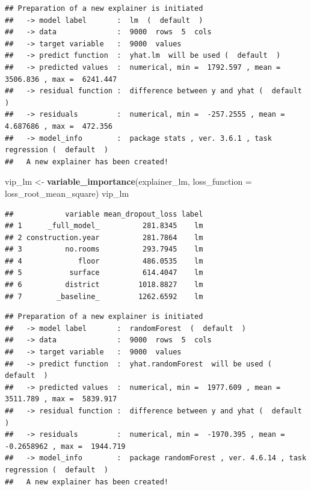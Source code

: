\documentclass[12pt,]{krantz}
\newenvironment{Shaded}{\begin{snugshade}}{\end{snugshade}}
\newcommand{\DataTypeTok}[1]{\textcolor[rgb]{0.13,0.29,0.53}{#1}}
\newcommand{\DecValTok}[1]{\textcolor[rgb]{0.00,0.00,0.81}{#1}}
\newcommand{\KeywordTok}[1]{\textcolor[rgb]{0.13,0.29,0.53}{\textbf{#1}}}
\newcommand{\NormalTok}[1]{#1}
\newcommand{\OperatorTok}[1]{\textcolor[rgb]{0.81,0.36,0.00}{\textbf{#1}}}
\newcommand{\OtherTok}[1]{\textcolor[rgb]{0.56,0.35,0.01}{#1}}
\newcommand{\StringTok}[1]{\textcolor[rgb]{0.31,0.60,0.02}{#1}}
\begin{document}
\begin{verbatim}
## Preparation of a new explainer is initiated
##   -> model label       :  lm  (  default  )
##   -> data              :  9000  rows  5  cols 
##   -> target variable   :  9000  values 
##   -> predict function  :  yhat.lm  will be used (  default  )
##   -> predicted values  :  numerical, min =  1792.597 , mean =  3506.836 , max =  6241.447  
##   -> residual function :  difference between y and yhat (  default  )
##   -> residuals         :  numerical, min =  -257.2555 , mean =  4.687686 , max =  472.356  
##   -> model_info        :  package stats , ver. 3.6.1 , task regression (  default  ) 
##   A new explainer has been created!
\end{verbatim}

\begin{Shaded}
\begin{Highlighting}[]
\NormalTok{vip_lm <-}\StringTok{ }\KeywordTok{variable_importance}\NormalTok{(explainer_lm, }
            \DataTypeTok{loss_function =}\NormalTok{ loss_root_mean_square)}
\NormalTok{vip_lm}
\end{Highlighting}
\end{Shaded}

\begin{verbatim}
##            variable mean_dropout_loss label
## 1      _full_model_          281.8345    lm
## 2 construction.year          281.7864    lm
## 3          no.rooms          293.7945    lm
## 4             floor          486.0535    lm
## 5           surface          614.4047    lm
## 6          district         1018.8827    lm
## 7        _baseline_         1262.6592    lm
\end{verbatim}

\begin{Shaded}
\end{Shaded}

\begin{verbatim}
## Preparation of a new explainer is initiated
##   -> model label       :  randomForest  (  default  )
##   -> data              :  9000  rows  5  cols 
##   -> target variable   :  9000  values 
##   -> predict function  :  yhat.randomForest  will be used (  default  )
##   -> predicted values  :  numerical, min =  1977.609 , mean =  3511.789 , max =  5839.917  
##   -> residual function :  difference between y and yhat (  default  )
##   -> residuals         :  numerical, min =  -1970.395 , mean =  -0.2658962 , max =  1944.719  
##   -> model_info        :  package randomForest , ver. 4.6.14 , task regression (  default  ) 
##   A new explainer has been created!
\end{verbatim}
\end{document}
